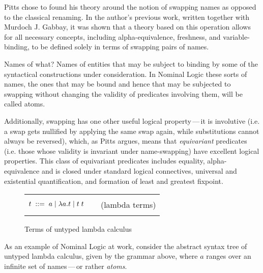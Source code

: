 \documentclass[english, mgr]{iithesis}
\renewcommand{\it}[1]{\textit{#1}}
\newcommand{\mdash}{\,---\,}
\def\-{{\mdash}}
\begin{document}
Pitts chose to found his theory around the notion of swapping names
as opposed to the classical renaming.
In the author's previous work\cite{abstract-syntax-variable-binding}, written together with Murdoch J. Gabbay,
it was shown that a theory based on this operation allows for all necessary concepts,
including alpha-equivalence, freshness, and variable-binding,
to be defined solely in terms of swapping pairs of names.

\begin{mdframed}[frametitle={\textnormal{\footnotesize \textbf{\citeauthor{nominal-logic}}, \textit{\citetitle{nominal-logic}}\cite{nominal-logic}:}}]
Names of what? Names of entities that may be subject to binding by some of
the syntactical constructions under consideration. In Nominal Logic these sorts of
names, the ones that may be bound and hence that may be subjected to swapping
without changing the validity of predicates involving them, will be called atoms.
\end{mdframed}

Additionally, swapping has one other useful logical property\-it is involutive
(i.e. a swap gets nullified by applying the same swap again, while substitutions cannot always be reversed),
which, as Pitts argues, means that \it{equivariant} predicates
(i.e. those whose validity is invariant under name-swapping)
have excellent logical properties.
This class of equivariant predicates includes equality, alpha-equivalence and is
closed under standard logical connectives, universal and existential quantification,
and formation of least and greatest fixpoint.

\begin{figure}[htbp]
  \centering
  \begin{tabularx}{\textwidth}{|CXr|}
      \hline & & \\
  $ t \; ::= \; a \mid \lambda a . t \mid t\;t $
  & & (lambda terms)
  \\ & & \\ \hline
\end{tabularx}
  \caption{Terms of untyped lambda calculus}
  \label{fig:lambda-calculus}
\end{figure}
As an example of Nominal Logic at work, consider the abstract syntax tree of untyped lambda calculus,
given by the grammar above, where $a$ ranges over an infinite set of names\-or rather \it{atoms}.
\end{document}
